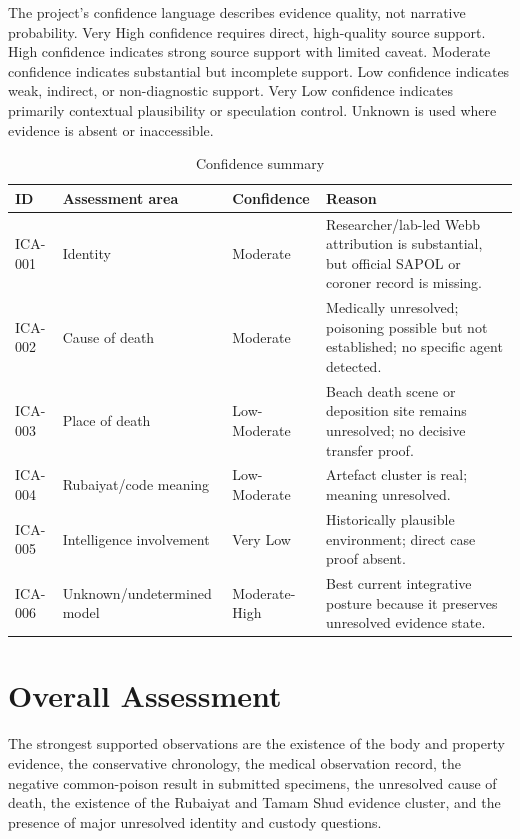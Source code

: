 The project's confidence language describes evidence quality, not narrative probability. Very High confidence requires direct, high-quality source support. High confidence indicates strong source support with limited caveat. Moderate confidence indicates substantial but incomplete support. Low confidence indicates weak, indirect, or non-diagnostic support. Very Low confidence indicates primarily contextual plausibility or speculation control. Unknown is used where evidence is absent or inaccessible.

\begin{table}[htbp]
\centering
\caption{Confidence summary}
\label{tab:chapter10-confidence-summary}
\scriptsize
\setlength{\tabcolsep}{2pt}
\renewcommand{\arraystretch}{1.12}
\begin{tabularx}{\textwidth}{>{\raggedright\arraybackslash}p{}>{\raggedright\arraybackslash}p{}>{\raggedright\arraybackslash}p{}>{\raggedright\arraybackslash}X}
\toprule
ID & Assessment area & Confidence & Reason \\
\midrule
ICA-001 & Identity & Moderate & Researcher/lab-led Webb attribution is substantial, but official SAPOL or coroner record is missing. \\
ICA-002 & Cause of death & Moderate & Medically unresolved; poisoning possible but not established; no specific agent detected. \\
ICA-003 & Place of death & Low-Moderate & Beach death scene or deposition site remains unresolved; no decisive transfer proof. \\
ICA-004 & Rubaiyat/code meaning & Low-Moderate & Artefact cluster is real; meaning unresolved. \\
ICA-005 & Intelligence involvement & Very Low & Historically plausible environment; direct case proof absent. \\
ICA-006 & Unknown/undetermined model & Moderate-High & Best current integrative posture because it preserves unresolved evidence state. \\
\bottomrule
\end{tabularx}
\end{table}

\section{Overall Assessment}

The strongest supported observations are the existence of the body and property evidence, the conservative chronology, the medical observation record, the negative common-poison result in submitted specimens, the unresolved cause of death, the existence of the Rubaiyat and Tamam Shud evidence cluster, and the presence of major unresolved identity and custody questions.

